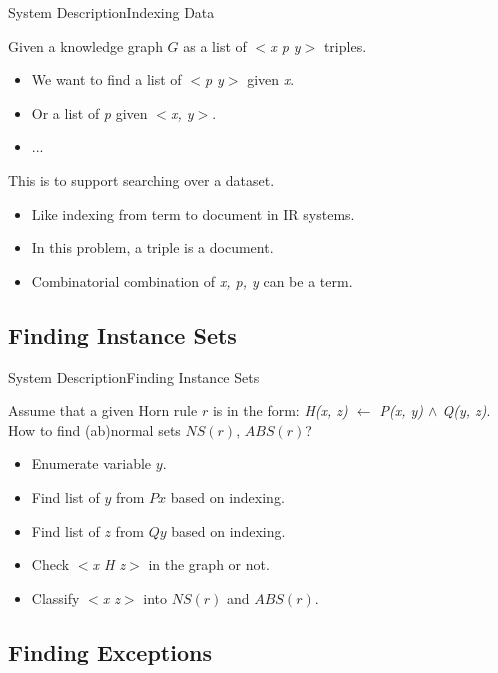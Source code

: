 \documentclass{beamer}
\begin{document}
\begin{frame}{System Description}{Indexing Data}

Given a knowledge graph $G$ as a list of \textit{$<$x p y$>$} triples.

\begin{itemize}
	\item {
    	We want to find a list of \textit{$<$p y$>$} given \textit{x}.
  	}
  	\item {   
    	Or a list of \textit{p} given \textit{$<$x, y$>$}.
	}
	\item {
		...
		\pause
	}
\end{itemize}

This is to support searching over a dataset.
\begin{itemize}
	\item Like indexing from term to document in IR systems.
  	\item In this problem, a triple is a document.
  	\item Combinatorial combination of \textit{x, p, y} can be a term.
\end{itemize}

\end{frame}

\subsection{Finding Instance Sets}

\begin{frame}{System Description}{Finding Instance Sets}

Assume that a given Horn rule $r$ is in the form: \textit{H(x, z) $\leftarrow$ P(x, y) $\wedge$ Q(y, z)}. How to find (ab)normal sets $NS(r)$, $ABS(r)$?
\begin{itemize}
	\item Enumerate variable $y$.
	\item Find list of $y$ from $Px$ based on indexing.
	\item Find list of $z$ from $Qy$ based on indexing.
	\item Check \textit{$<$x H z$>$} in the graph or not.
	\item Classify \textit{$<$x z$>$} into $NS(r)$ and $ABS(r)$.
\end{itemize}

\end{frame}

\subsection{Finding Exceptions}
\end{document}

